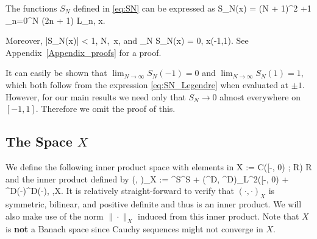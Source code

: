 \bl \label{Lemma_S_N}
The functions \(S_N\) defined in \eqref{eq:SN} can be expressed as
\be\label{eq:SN_Legendre}
S_N(x) =  {(N + 1)^2 +1} \sum_{n=0}^N (2n + 1) L_n, \quad x\in[-1,1].
\ee

Moreover,
\be\label{eq:uniform-bdd}
    |S_N(x)| < 1, \quad \forall N\in\Nzero,\ \forall x\in[-1,1],
\ee
and
\be\label{eq:pw-conv}
    \lim_{N\to\infty} S_N(x) = 0, \quad \forall x\in(-1,1).
\ee
\el
See Appendix~\ref{Appendix_proofs} for a proof.

\br
It can easily be shown that \(\lim_{N\to\infty}S_N(-1) = 0\) and \(\lim_{N\to\infty} S_N(1) = 1\), which both follow from the expression \cref{eq:SN_Legendre} when evaluated at \(\pm1\).  However, for our main results we need only that \(S_N \to 0\) almost everywhere on \([-1,1]\). Therefore we omit the proof of this.
\er


\subsection{The Space \(X\)}

We define the following inner product space with elements in 
\be
    X := \mathcal C([-\tau, 0) ; \mathbb R) \times \mathbb R
\ee
and the inner product defined by
\be
    (\Phi, \Psi)_X := \Phi^S\Psi^S +  \tau (\Phi^D, \Psi^D)_{L^2([-\tau, 0)} + \Phi^D(-\tau)\Psi^D(-\tau), \quad \Phi,\Psi\in X.
\ee
It is relatively straight-forward to verify that \((\cdot, \cdot)_X\) is symmetric, bilinear, and positive definite and thus is an inner product. We will also make use of the norm \(\|\cdot\|_X\) induced from this inner product. Note that \(X\) is \textbf{not} a Banach space since Cauchy sequences might not converge in \(X\).